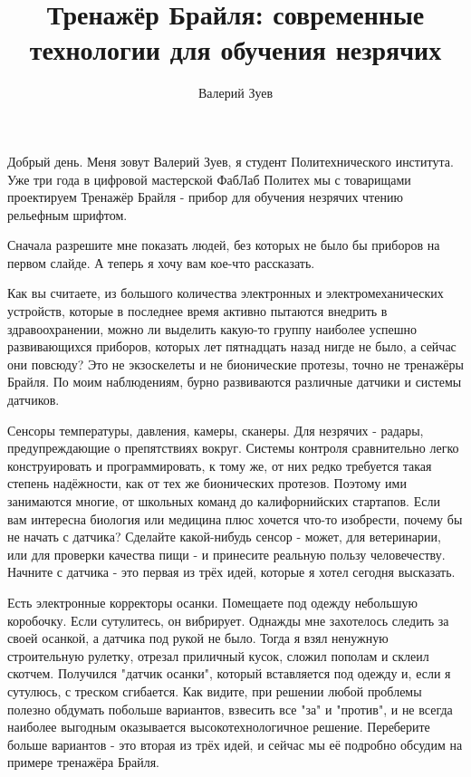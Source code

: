 \documentclass[a4paper,12pt]{article} %
\begin{document}
	
\title{Тренажёр Брайля: современные технологии для обучения незрячих}
\author{Валерий Зуев}
\date{\vspace{-5ex}} %
\maketitle

Добрый день. Меня зовут Валерий Зуев, я студент Политехнического института. Уже три года в цифровой мастерской ФабЛаб Политех мы с товарищами проектируем Тренажёр Брайля - прибор для обучения незрячих чтению рельефным шрифтом.

Сначала разрешите мне показать людей, без которых не было бы приборов на первом слайде. А теперь я хочу вам кое-что рассказать.

Как вы считаете, из большого количества электронных и электромеханических устройств, которые в последнее время активно пытаются внедрить в здравоохранении, можно ли выделить какую-то группу наиболее успешно развивающихся приборов, которых лет пятнадцать назад нигде не было, а сейчас они повсюду? Это не экзоскелеты и не бионические протезы, точно не тренажёры Брайля. По моим наблюдениям, бурно развиваются различные датчики и системы датчиков.

Сенсоры температуры, давления, камеры, сканеры. Для незрячих - радары, предупреждающие о препятствиях вокруг. Системы контроля сравнительно легко конструировать и программировать, к тому же, от них редко требуется такая степень надёжности, как от тех же бионических протезов. Поэтому ими занимаются многие, от школьных команд до калифорнийских стартапов. Если вам интересна биология или медицина плюс хочется что-то изобрести, почему бы не начать с датчика? Сделайте какой-нибудь сенсор - может, для ветеринарии, или для проверки качества пищи - и принесите реальную пользу человечеству. Начните с датчика - это первая из трёх идей, которые я хотел сегодня высказать.

Есть электронные корректоры осанки. Помещаете под одежду небольшую коробочку. Если сутулитесь, он вибрирует. Однажды мне захотелось следить за своей осанкой, а датчика под рукой не было. Тогда я взял ненужную строительную рулетку, отрезал приличный кусок, сложил пополам и склеил скотчем. Получился "датчик осанки", который вставляется под одежду и, если я сутулюсь, с треском сгибается. Как видите, при решении любой проблемы полезно обдумать побольше вариантов, взвесить все "за" и "против", и не всегда наиболее выгодным оказывается высокотехнологичное решение. Переберите больше вариантов - это вторая из трёх идей, и сейчас мы её подробно обсудим на примере тренажёра Брайля.
\end{document}
